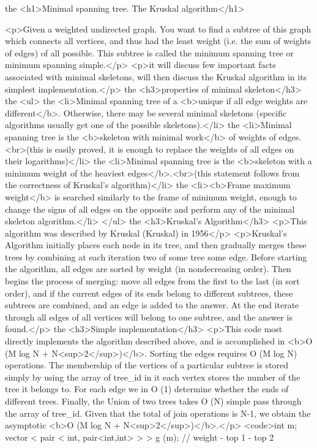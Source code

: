 the <h1>Minimal spanning tree. The Kruskal algorithm</h1>

<p>Given a weighted undirected graph. You want to find a subtree of this graph which connects all vertices, and thus had the least weight (i.e. the sum of weights of edges) of all possible. This subtree is called the minimum spanning tree or minimum spanning simple.</p>
<p>it will discuss few important facts associated with minimal skeletons, will then discuss the Kruskal algorithm in its simplest implementation.</p>
the <h3>properties of minimal skeleton</h3>
the <ul>
the <li>Minimal spanning tree of a <b>unique if all edge weights are different</b>. Otherwise, there may be several minimal skeletons (specific algorithms usually get one of the possible skeletons).</li>
the <li>Minimal spanning tree is the <b>skeleton with minimal work</b> of weights of edges.<br>(this is easily proved, it is enough to replace the weights of all edges on their logarithms)</li>
the <li>Minimal spanning tree is the <b>skeleton with a minimum weight of the heaviest edges</b>.<br>(this statement follows from the correctness of Kruskal's algorithm)</li>
the <li><b>Frame maximum weight</b> is searched similarly to the frame of minimum weight, enough to change the signs of all edges on the opposite and perform any of the minimal skeleton algorithm.</li>
</ul>
the <h3>Kruskal's Algorithm</h3>
<p>This algorithm was described by Kruskal (Kruskal) in 1956</p>
<p>Kruskal's Algorithm initially places each node in its tree, and then gradually merges these trees by combining at each iteration two of some tree some edge. Before starting the algorithm, all edges are sorted by weight (in nondecreasing order). Then begins the process of merging: move all edges from the first to the last (in sort order), and if the current edges of its ends belong to different subtrees, these subtrees are combined, and an edge is added to the answer. At the end iterate through all edges of all vertices will belong to one subtree, and the answer is found.</p>
the <h3>Simple implementation</h3>
<p>This code most directly implements the algorithm described above, and is accomplished in <b>O (M log N + N<sup>2</sup>)</b>. Sorting the edges requires O (M log N) operations. The membership of the vertices of a particular subtree is stored simply by using the array of tree_id in it each vertex stores the number of the tree it belongs to. For each edge we in O (1) determine whether the ends of different trees. Finally, the Union of two trees takes O (N) simple pass through the array of tree_id. Given that the total of join operations is N-1, we obtain the asymptotic <b>O (M log N + N<sup>2</sup>)</b>.</p>
<code>int m;
vector < pair < int, pair<int,int> > > g (m); // weight - top 1 - top 2

